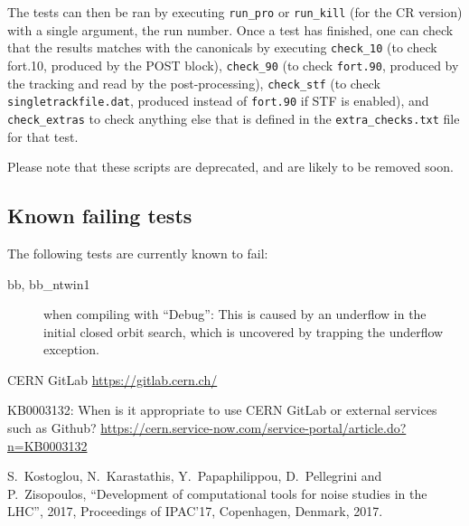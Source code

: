 \documentclass[english,BCOR=0mm,DIV=18]{scrartcl}
\begin{document}
The tests can then be ran by executing \texttt{run\_pro} or \texttt{run\_kill} (for the CR version) with a single argument, the run number.
Once a test has finished, one can check that the results matches with the canonicals by executing \texttt{check\_10} (to check fort.10, produced by the POST block), \texttt{check\_90} (to check \texttt{fort.90}, produced by the tracking and read by the post-processing), \texttt{check\_stf} (to check \texttt{singletrackfile.dat}, produced instead of \texttt{fort.90} if STF is enabled), and \texttt{check\_extras} to check anything else that is defined in the \texttt{extra\_checks.txt} file for that test.

Please note that these scripts are deprecated, and are likely to be removed soon.

\subsection{Known failing tests}
The following tests are currently known to fail:
\begin{description}
\item[bb, bb\_ntwin1] when compiling with ``Debug'': This is caused by an underflow in the initial closed orbit search, which is uncovered by trapping the underflow exception.
\end{description}

\begin{thebibliography}{2}

 CERN GitLab \url{https://gitlab.cern.ch/}

 KB0003132: When is it appropriate to use CERN GitLab or external services such as Github? \url{https://cern.service-now.com/service-portal/article.do?n=KB0003132}

  S.~Kostoglou, N.~Karastathis, Y.~Papaphilippou, D.~Pellegrini and P.~Zisopoulos,
  ``Development of computational tools for noise studies in the LHC'', 
  2017, Proceedings of IPAC'17, Copenhagen, Denmark, 2017.

\end{thebibliography}
\end{document}

